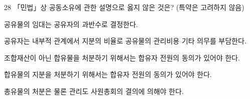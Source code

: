 \begin{question}{28}
「민법」상 공동소유에 관한 설명으로 옳지 않은 것은? (특약은 고려하지 않음)
\begin{choices}
  \item 공유물의 임대는 공유자의 과반수로 결정한다.
  \item 공유자는 내부적 관계에서 지분의 비율로 공유물의 관리비용 기타 의무를 부담한다.
  \item 조합재산이 아닌 합유물을 처분하기 위해서는 합유자 전원의 동의가 있어야 한다.
  \item 합유물의 지분을 처분하기 위해서는 합유자 전원의 동의가 있어야 한다.
  \item 총유물의 처분은 물론 관리도 사원총회의 결의에 의해야 한다.
\end{choices}
\end{question}
